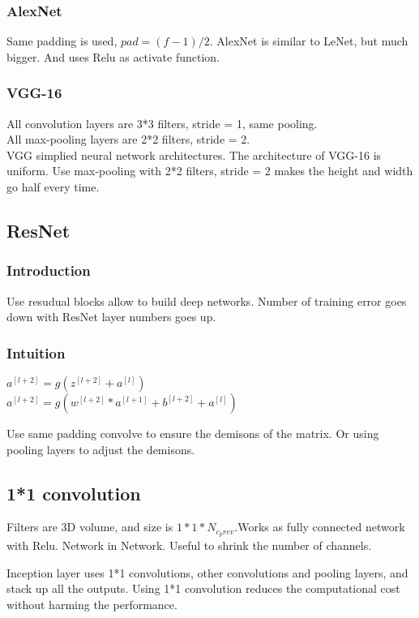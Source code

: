 \documentclass{article}
\begin{document}
		\subsubsection{AlexNet}
			Same padding is used, $pad = (f - 1)/2$. AlexNet is similar to LeNet, but much bigger. And uses Relu as activate function.
		\subsubsection{VGG-16}
			All convolution layers are 3*3 filters, stride = 1, same pooling.\\
			All max-pooling layers are 2*2 filters, stride = 2.\\
			VGG simplied neural network architectures. The architecture of VGG-16 is uniform. Use max-pooling with 2*2 filters, stride = 2 makes the height and width go half every time.
	\subsection{ResNet}
		\subsubsection{Introduction}
			Use resudual blocks allow to build deep networks. Number of training error goes down with ResNet layer numbers goes up.
		\subsubsection{Intuition}
			\begin{center}
			$a^{[l+2]} = g(z^{[l+2]}+a^{[l]})$ \\
			$a^{[l+2]} = g(w^{[l+2]}*a^{[l+1]}+b^{[l+2]}+a^{[l]})$
			\end{center}
			\begin{flushleft}
				Use same padding convolve to ensure the demisons of the matrix. Or using pooling layers to adjust the demisons.
			\end{flushleft}
	\subsection{1*1 convolution}
		\begin{flushleft}
			Filters are 3D volume, and size is $1*1*N_{c_prev}$.Works as fully connected network with Relu. Network in Network. Useful to shrink the number of channels.
		\end{flushleft}
		\begin{flushleft}
			Inception layer uses 1*1 convolutions, other convolutions and pooling layers, and stack up all the outputs. Using 1*1 convolution reduces the computational cost without harming the performance.
		\end{flushleft}
\end{document}
